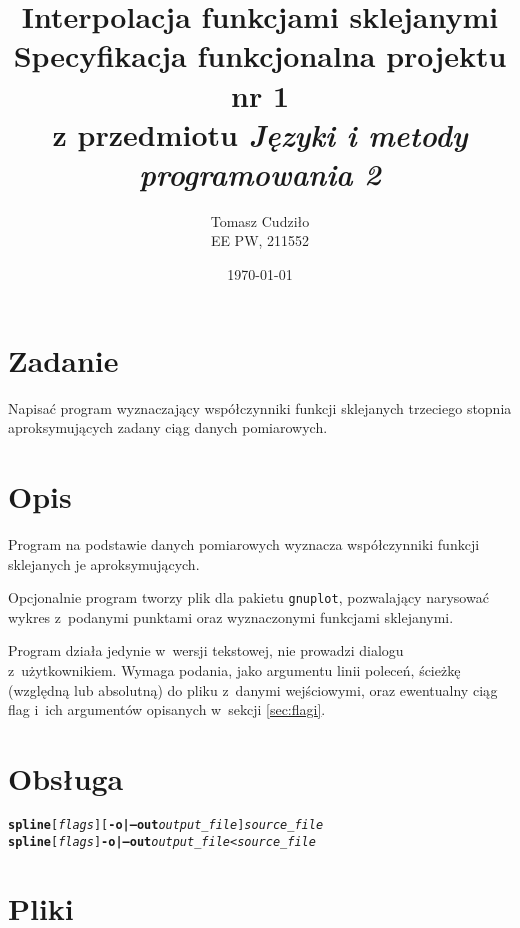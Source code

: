 \documentclass[12pt,a4paper]{article}
\newcommand{\prog}[1]{\texttt{#1}}
\newcommand{\flag}[1]{\textbf{\prog{#1}}}
\begin{document}
\title{ 
  Interpolacja funkcjami sklejanymi\\
  {\normalsize Specyfikacja funkcjonalna projektu nr 1}\\\vspace{-12pt}
  {\normalsize z przedmiotu \emph{Języki i metody programowania 2}}
}
\author{
  Tomasz Cudziło\\
  {\small EE PW, 211552}
}
\date{\today}
\maketitle

\section*{Zadanie}
\label{sec:zadanie}

Napisać program wyznaczający współczynniki funkcji sklejanych trzeciego stopnia
aproksymujących zadany ciąg danych pomiarowych.

\vspace{24pt}

\section{Opis}
\label{sec:opis}

Program na podstawie danych pomiarowych wyznacza współczynniki funkcji
sklejanych je aproksymujących.

Opcjonalnie program tworzy plik dla pakietu \prog{gnuplot}, pozwalający
narysować wykres z~podanymi punktami oraz wyznaczonymi funkcjami sklejanymi.

Program działa jedynie w~wersji tekstowej, nie prowadzi dialogu
z~użytkownikiem. Wymaga podania, jako argumentu linii poleceń, ścieżkę
(względną lub absolutną) do pliku z~danymi wejściowymi, oraz ewentualny ciąg
flag i~ich argumentów opisanych w~sekcji \ref{sec:flagi}.

\section{Obsługa}

\begin{alltt}
\textbf{spline} [\textsl{flags}] [\flag{-o|--out} \textsl{output\_file}] \textsl{source\_file}
\textbf{spline} [\textsl{flags}] \flag{-o|--out} \textsl{output\_file} < \textsl{source\_file}
\end{alltt}

\section{Pliki}
\label{sec:pliki}
\end{document}
